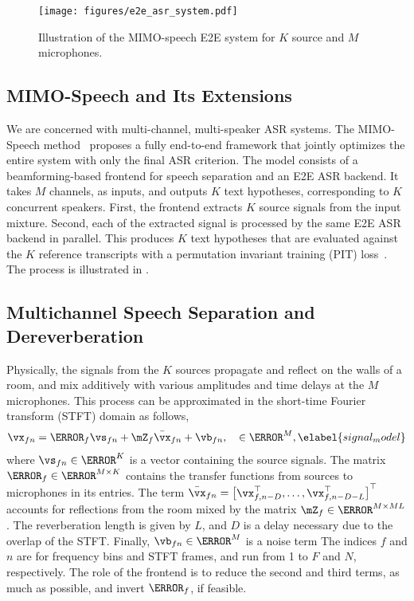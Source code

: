 \documentclass[a4paper]{article}
\begin{document}
\begin{figure}
  \centering
  \texttt{[image: figures/e2e\_asr\_system.pdf]}
  \caption{Illustration of the MIMO-speech E2E system for $K$ source and $M$ microphones.}
\end{figure}

\subsection{MIMO-Speech and Its Extensions}

We are concerned with multi-channel, multi-speaker ASR systems.
The MIMO-Speech method~\cite{changMIMOSpeechEndtoendMultichannel2019,changEndToEndMultiSpeaker2020} proposes a fully end-to-end framework that jointly optimizes the entire system with only the final ASR criterion.
The model consists of a beamforming-based frontend for speech separation and an E2E ASR backend.
It takes $M$ channels, as inputs, and outputs $K$ text hypotheses, corresponding to $K$ concurrent speakers.
First, the frontend extracts $K$ source signals from the input mixture.
Second, each of the extracted signal is processed by the same E2E ASR backend in parallel.
This produces $K$ text hypotheses that are evaluated against the $K$ reference transcripts with a permutation invariant training (PIT) loss~\cite{kolbaekMultitalkerSpeechSeparation2017}.
The process is illustrated in .


\subsection{Multichannel Speech Separation and Dereverberation}

Physically, the signals from the $K$ sources propagate and reflect on the walls of a room, and mix additively with various amplitudes and time delays at the $M$ microphones.
This process can be approximated in the short-time Fourier transform (STFT) domain as follows,
\begin{align}
  \vx_{fn} = \mA_f \vs_{fn} + \mZ_f \bar{\vx}_{fn}  + \vb_{fn}, \quad \in \C^M,
  \elabel{signal_model}
\end{align}
where $\vs_{fn} \in \C^K$ is a vector containing the source signals.
The matrix $\mA_f\in \C^{M\times K}$ contains the transfer functions from sources to microphones in its entries.
The term $\bar{\vx}_{fn} = \begin{bmatrix} \vx_{f,n-D}^\top,\ldots,\vx_{f,n-D-L}^\top\end{bmatrix}^\top$ accounts for reflections from the room mixed by the matrix $\mZ_f \in \C^{M \times ML}$.
The reverberation length is given by $L$, and $D$ is a delay necessary due to the overlap of the STFT.
Finally, $\vb_{fn}\in \C^M$ is a noise term
The indices $f$ and $n$ are for frequency bins and STFT frames, and run from 1 to $F$ and $N$, respectively.
The role of the frontend is to reduce the second and third terms, as much as possible, and invert $\mA_f$, if feasible.
\end{document}
